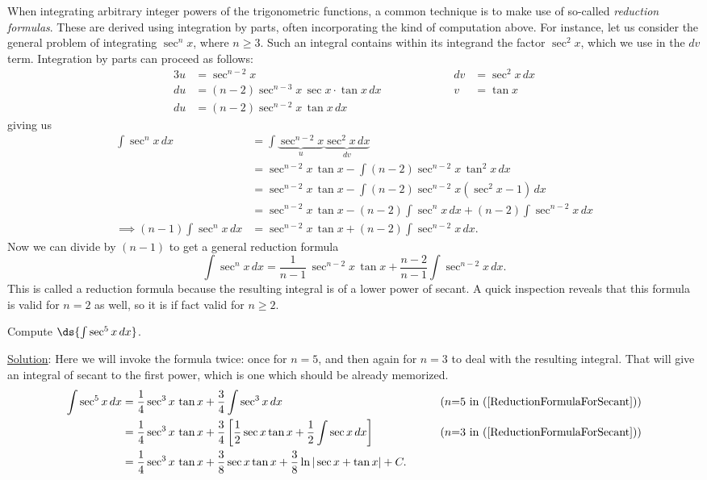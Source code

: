 When integrating arbitrary integer powers of the trigonometric
functions, a common technique is to make use of so-called
{\it reduction formulas}.  These are derived using integration
by parts, often incorporating the kind of computation 
above.  For instance, let us consider the general problem of
integrating $\sec^nx$, where $n\ge3$.  Such an  integral contains
within its integrand
the factor $\sec^2x$, which we use in the $dv$ term.
Integration by parts can proceed as follows:
\begin{alignat*}{3}
u&=\sec^{n-2} x&&\qquad\qquad&dv&=\sec^2x\,dx\\
du&=(n-2)\sec^{n-3}x\,\sec x \cdot\tan x\,dx&&&v&=\tan x\\
du&=(n-2)\sec^{n-2}x\,\tan x\,dx 
\end{alignat*}
giving us
\begin{align*}
\int\sec^nx\,dx
&=\int\underbrace{\sec^{n-2}x}_{u}\underbrace{\sec^2x\,dx}_{dv}\\
&=\sec^{n-2}x\,\tan x-\int(n-2)\sec^{n-2}x\,\tan^2x\,dx\\
&=\sec^{n-2}x\,\tan x-\int(n-2)\sec^{n-2}x\left(\sec^2x-1\right)\,dx\\
&=\sec^{n-2}x\,\tan x-(n-2)\int\sec^nx\,dx+(n-2)\int\sec^{n-2}x\,dx\\
\implies
(n-1)\int\sec^nx\,dx&=\sec^{n-2}x\,\tan x+(n-2)\int\sec^{n-2}x\,dx.
\end{align*}
Now we can divide by $(n-1)$ to get a general reduction formula
\begin{equation}
\int\sec^nx\,dx=\frac1{n-1}\,\sec^{n-2}x\,\tan x+\frac{n-2}{n-1}\int
\sec^{n-2}x\,dx.\label{ReductionFormulaForSecant}\end{equation}
This is called a reduction formula because the resulting integral
is of a lower power of secant.  A quick inspection reveals that
this formula is valid for $n=2$ as well, so it is if fact valid
for $n\ge2$.  

\bex Compute $\ds{\int\sec^5x\,dx}$.

\underline{Solution}: Here we will invoke the formula twice:
once for $n=5$, and then again for $n=3$ to deal with the
resulting integral.  That will give an integral of secant
to the first power, which is one which should be already
memorized.
\begin{alignat*}{2}
\int\sec^5x\,dx&=\frac14\sec^3x\,\tan x+\frac{3}{4}\int\sec^3x\,dx
 &\qquad&\text{($n$=5 in (\ref{ReductionFormulaForSecant}))}\\
 &=\frac14\sec^3x\,\tan x+\frac34\left[\frac12\sec x\tan x+\frac12
              \int\sec x\,dx\right]&
        &\text{($n$=3 in (\ref{ReductionFormulaForSecant}))}\\
 &=\frac14\sec^3x\,\tan x+\frac38\sec x\tan x+\frac38
         \ln|\sec x+\tan x|+C.\end{alignat*}
\eex

